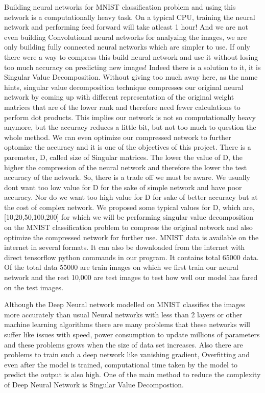 Building neural networks for MNIST classification problem and using this
network is a computationally heavy task. On a typical CPU, training the neural
network and performing feed forward will take atleast 1 hour! And we are not
even building Convolutional neural networks for analyzing the images, we are
only building fully connected neural networks which are simpler to use. If
only there were a way to compress this build neural network and use it without
losing too much accuracy on predicting new images! Indeed there is a solution
to it, it is Singular Value Decomposition. Without giving too much away here,
as the name hints, singular value decomposition technique compresses our
original neural network by coming up with different representation of the
original weight matrices that are of the lower rank and therefore need fewer
calculations to perform dot products. This implies our network is not so
computationally heavy anymore, but the accuracy reduces a little bit, but not
too much to question the whole method. We can even optimize our compressed
network to further optomize the accuracy and it is one of the objectives of
this project. There is a paremeter, D, called size of Singular matrices. The
lower the value of D, the higher the compression of the neural network and
therefore the lower the test accuracy of the network. So, there is a trade off
we must be aware. We usually dont want too low value for D for the sake of
simple network and have poor accuracy. Nor do we want too high value for D for
sake of better accuracy but at the cost of complex network. We proposed some
typical values for D, which are, [10,20,50,100,200] for which we will be
performing singular value decomposition on the MNIST classification problem to
compress the original network and also optimize the compressed network for
further use. MNIST data is available on the internet in several formats. It
can also be downloaded from the internet with direct tensorflow python
commands in our program. It contains total 65000 data. Of the total data 55000
are train images on which we first train  our neural network and the rest
10,000 are test images to test how well our model has fared on the test
images.

Although the Deep Neural network modelled on MNIST classifies the images more
accurately than usual Neural networks with less than 2 layers or other machine
learning algorithms there are many problems that these networks will suffer like
issues with speed, power consumption to update millions of parameters and  these
problems grows when the size of data set increases. Also there are problems to
train such a deep network like vanishing gradient, Overfitting and even after
the model is trained, computational time taken by the model to predict the
output is also high. One of the main method to reduce the complexity of Deep
Neural Network is Singular Value Decompostion.


